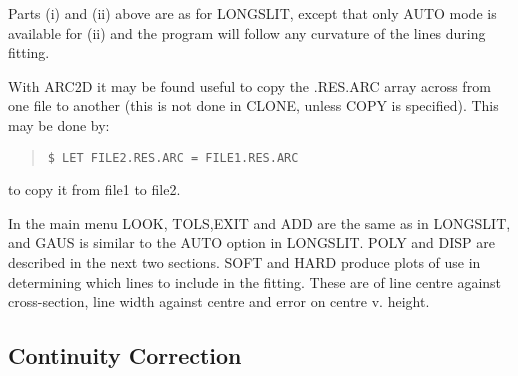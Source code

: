 Parts (i) and (ii) above are as for LONGSLIT, except that only AUTO
mode is available for (ii) and the program will follow any curvature
of the lines during fitting.

With ARC2D it may be found useful to copy the .RES.ARC array across
from one file to another (this is not done in CLONE, unless COPY is
specified).
This may be done by:
\begin{quote}\begin{verbatim}
$ LET FILE2.RES.ARC = FILE1.RES.ARC
\end{verbatim}\end{quote}
to copy it from file1 to file2.

In the main menu LOOK, TOLS,EXIT and ADD are the same as in LONGSLIT,
and GAUS is similar to the AUTO option in LONGSLIT. POLY and DISP are
described in the next two sections. SOFT and HARD produce plots of use
in determining which lines to include in the fitting. These are of line
centre against cross-section, line width against centre and error on
centre v. height.

\subsection{Continuity Correction}
\label{arc2d.continuity}

